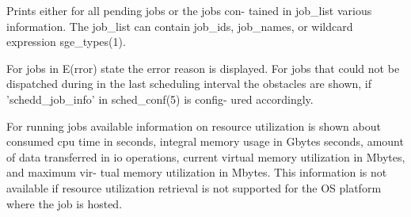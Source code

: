 \documentclass[11pt,final,oneside]{fithesis}
\begin{document}
			Prints either for all pending jobs  or  the  jobs  con-
          tained  in  job_list  various information. The job_list
          can contain job_ids, job_names, or wildcard  expression
          sge_types(1).

          For  jobs  in  E(rror)  state  the  error   reason   is
          displayed. For jobs that could not be dispatched during
          in the  last  scheduling  interval  the  obstacles  are
          shown, if 'schedd_job_info' in sched_conf(5) is config-
          ured accordingly.

          For running  jobs  available  information  on  resource
          utilization   is  shown  about  consumed  cpu  time  in
          seconds,  integral  memory  usage  in  Gbytes  seconds,
          amount  of  data  transferred in io operations, current
          virtual memory utilization in Mbytes, and maximum  vir-
          tual  memory utilization in Mbytes. This information is
          not available if resource utilization retrieval is  not
          supported for the OS platform where the job is hosted.
          
\end{document}
